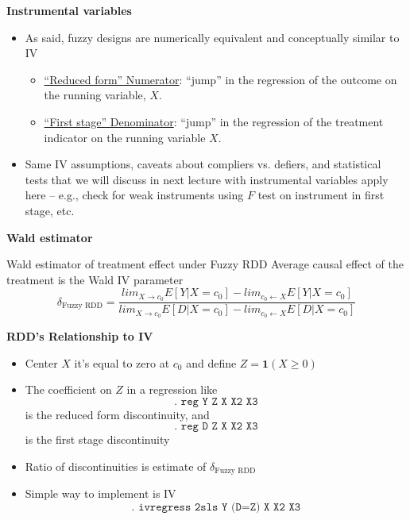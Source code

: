 \documentclass[notes=show]{beamer}
\begin{document}
\begin{frame}[plain]
\begin{center}
\textbf{Instrumental variables}
\end{center}

	\begin{itemize}
	\item As said, fuzzy designs are numerically equivalent and conceptually similar to IV
		\begin{itemize}
		\item \underline{``Reduced form'' Numerator}: ``jump'' in the regression of the outcome on the running variable, $X$.
		\item \underline{``First stage'' Denominator}: ``jump'' in the regression of the treatment indicator on the running variable $X$.
		\end{itemize}
	\item Same IV assumptions, caveats about compliers vs. defiers, and statistical tests that we will discuss in next lecture with instrumental variables apply here -- e.g., check for weak instruments using $F$ test on instrument in first stage, etc.
	\end{itemize}

\end{frame}



\begin{frame}[plain]
	\begin{center}
	\textbf{Wald estimator}
	\end{center}
	
	\begin{block}{Wald estimator of treatment effect under Fuzzy RDD}
	Average causal effect of the treatment is the Wald IV parameter$$\delta_{\text{Fuzzy RDD}} = \frac{ lim_{X \rightarrow c_0} E[Y | X = c_0] -  lim_{c_0 \leftarrow X} E[Y | X = c_0] } { lim_{X \rightarrow c_0} E[D | X = c_0] -  lim_{c_0 \leftarrow X} E[D | X = c_0] } $$
	\end{block}
	
\end{frame}


\begin{frame}[plain]
	\begin{center}
	\textbf{RDD's Relationship to IV}
	\end{center}
	
	\begin{itemize}
	\item Center $X$ it's equal to zero at $c_0$ and define $Z=\textbf{1}(X\geq{0})$
	\item The coefficient on $Z$ in a regression like$$\texttt{. reg Y Z X X2 X3}$$ is the reduced form discontinuity, and $$\texttt{. reg D Z X X2 X3}$$ is the first stage discontinuity
	\item Ratio of discontinuities is estimate of $\delta_{\text{Fuzzy RDD}}$ 
	\item Simple way to implement is IV$$\texttt{. ivregress 2sls Y (D=Z) X X2 X3}$$
	\end{itemize}
\end{frame}
\end{document}
